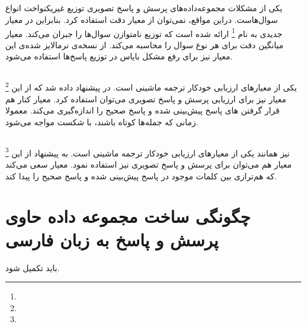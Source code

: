 \subsection{\cite{kafle2017analysis}}

		یکی از مشکلات مجموعه‌داده‌های پرسش و پاسخ تصویری توزیع غیریکنواخت انواع سوال‌هاست. دراین مواقع، نمی‌توان از معیار دقت استفاده کرد. بنابراین  در 
	\cite{kafle2017analysis}
		 معیار جدیدی به نام 
	\footnote{}
		ارائه شده است که توزیع نامتوازن سوال‌ها را جبران می‌کند. معیار 
	میانگین دقت برای هر نوع سوال را محاسبه می‌کند. از نسخه‌ی نرمالایز شده‌ی این معیار نیز برای رفع مشکل بایاس در توزیع پاسخ‌ها استفاده می‌شود.


\subsection{\cite{papineni2002bleu}}

		\footnote{}
		یکی از معیارهای ارزیابی خودکار ترجمه ماشینی است. در
		\cite{gurari2018vizwiz}
		 پیشنهاد داده شد که از این معیار نیز برای ارزیابی پرسش و پاسخ تصویری می‌توان استفاده کرد. معیار 
		کنار هم قرار گرفتن 
		های پاسخ پیش‌‌بینی شده و پاسخ صحیح را اندازه‌گیری می‌کند. معمولا
	زمانی که جمله‌ها کوتاه باشند، با شکست مواجه می‌‌شود.
		


\subsection{\cite{denkowski2014meteor}}
		\footnote{}
		نیز همانند
	یکی از معیارهای ارزیابی خودکار ترجمه ماشینی است. به پیشنهاد 
	\cite{gurari2018vizwiz}
	 از این معیار هم می‌توان برای پرسش و پاسخ تصویری نیز استفاده نمود. معیار 
		سعی می‌کند که هم‌ترازی بین کلمات موجود در پاسخ پیش‌بینی شده و پاسخ صحیح را پیدا کند.


\section{ چگونگی ساخت مجموعه داده حاوی پرسش و پاسخ به زبان فارسی}
باید تکمیل شود.